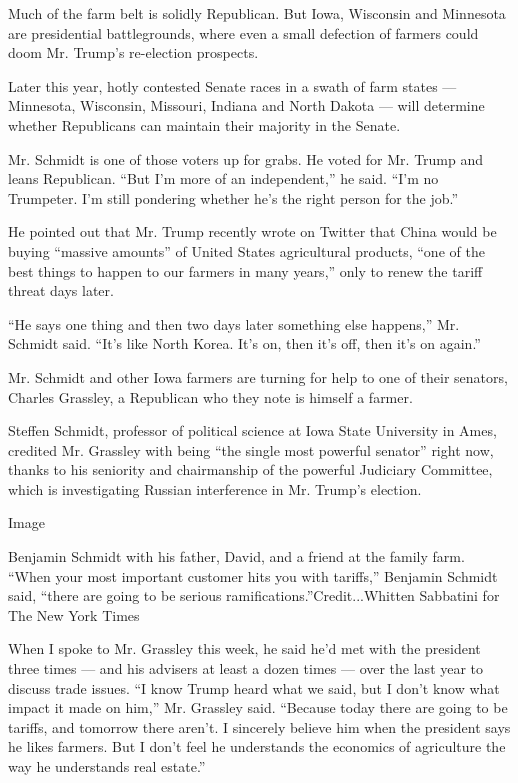 Much of the farm belt is solidly Republican. But Iowa, Wisconsin and
Minnesota are presidential battlegrounds, where even a small defection
of farmers could doom Mr. Trump's re-election prospects.

Later this year, hotly contested Senate races in a swath of farm states
--- Minnesota, Wisconsin, Missouri, Indiana and North Dakota --- will
determine whether Republicans can maintain their majority in the Senate.

Mr. Schmidt is one of those voters up for grabs. He voted for Mr. Trump
and leans Republican. ``But I'm more of an independent,'' he said. ``I'm
no Trumpeter. I'm still pondering whether he's the right person for the
job.''

He pointed out that Mr. Trump recently wrote on Twitter that China would
be buying ``massive amounts'' of United States agricultural products,
``one of the best things to happen to our farmers in many years,'' only
to renew the tariff threat days later.

``He says one thing and then two days later something else happens,''
Mr. Schmidt said. ``It's like North Korea. It's on, then it's off, then
it's on again.''

Mr. Schmidt and other Iowa farmers are turning for help to one of their
senators, Charles Grassley, a Republican who they note is himself a
farmer.

Steffen Schmidt, professor of political science at Iowa State University
in Ames, credited Mr. Grassley with being ``the single most powerful
senator'' right now, thanks to his seniority and chairmanship of the
powerful Judiciary Committee, which is investigating Russian
interference in Mr. Trump's election.

Image

Benjamin Schmidt with his father, David, and a friend at the family
farm. ``When your most important customer hits you with tariffs,''
Benjamin Schmidt said, ``there are going to be serious
ramifications.''Credit...Whitten Sabbatini for The New York Times

When I spoke to Mr. Grassley this week, he said he'd met with the
president three times --- and his advisers at least a dozen times ---
over the last year to discuss trade issues. ``I know Trump heard what we
said, but I don't know what impact it made on him,'' Mr. Grassley said.
``Because today there are going to be tariffs, and tomorrow there
aren't. I sincerely believe him when the president says he likes
farmers. But I don't feel he understands the economics of agriculture
the way he understands real estate.''

